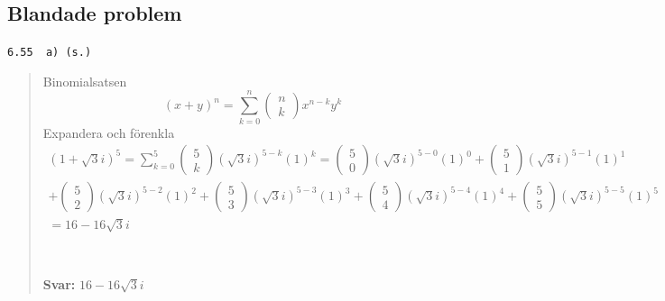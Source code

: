 \documentclass[a4paper]{article}
\newcommand{\tskcol}[1]{\textcolor{tskcol}{#1}}
\begin{document}
	\subsection*{Blandade problem}
	
	\texttt{\tskcol{6.55~~a) (s.)}}
	\begin{quotation}
		\noindent
		Binomialsatsen
		\begin{equation*}
			(x+y)^{n}=\sum_{k=0}^{n}\left(\begin{array}{l}
			n \\
			k
			\end{array}\right) x^{n-k} y^{k}
			\end{equation*}
			Expandera och förenkla
			\begin{equation*}
				\begin{array}{l}
				(1+\sqrt{3} i)^{5}=\sum_{k=0}^{5}\left(\begin{array}{l}
				5 \\
				k
				\end{array}\right)(\sqrt{3} i)^{5-k}(1)^{k}=\left(\begin{array}{l}
				5 \\
				0
				\end{array}\right)(\sqrt{3} i)^{5-0}(1)^{0}+\left(\begin{array}{l}
				5 \\
				1
				\end{array}\right)(\sqrt{3} i)^{5-1}(1)^{1} \\
				+\left(\begin{array}{l}
				5 \\
				2
				\end{array}\right)(\sqrt{3} i)^{5-2}(1)^{2}+\left(\begin{array}{l}
				5 \\
				3
				\end{array}\right)(\sqrt{3} i)^{5-3}(1)^{3}+\left(\begin{array}{l}
				5 \\
				4
				\end{array}\right)(\sqrt{3} i)^{5-4}(1)^{4}+\left(\begin{array}{l}
				5 \\
				5
				\end{array}\right)(\sqrt{3} i)^{5-5}(1)^{5} \\
				=16- 16\sqrt{3} i \\
				\end{array}
				\end{equation*}
		\\ \\
		\textbf{Svar:} $16- 16\sqrt{3} i$
	\end{quotation}
	
\end{document}
